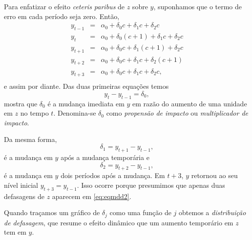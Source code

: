 \documentclass[
]{book}
\theoremstyle{definition}
\theoremstyle{definition}
\theoremstyle{definition}
\theoremstyle{remark}
\begin{document}
Para enfatizar o efeito \emph{ceteris  paribus} de \(z\) sobre \(y\), suponhamos que o termo de erro em cada período seja zero. Então,
\begin{eqnarray*}
y_{t-1}&=&\alpha_0+\delta_0c+\delta_1c+\delta_2c\\
y_{t}&=&\alpha_0+\delta_0(c+1)+\delta_1c+\delta_2c\\
y_{t+1}&=&\alpha_0+\delta_0c+\delta_1(c+1)+\delta_2c\\
y_{t+2}&=&\alpha_0+\delta_0c+\delta_1c+\delta_2(c+1)\\
y_{t+3}&=&\alpha_0+\delta_0c+\delta_1c+\delta_2c,\\
\end{eqnarray*}
e assim por diante. Das duas primeiras equações temos
\begin{equation*}
y_t-y_{t-1} =\delta_0,
\end{equation*}
mostra que \(\delta_0\) é a mudança imediata em \(y\) em razão do aumento de uma unidade em \(z\) no tempo \(t\). Denomina-se \(\delta_0\) como \emph{propensão de impacto} ou \emph{multiplicador de impacto}.

Da mesma forma,
\begin{equation*}
\delta_1  =  y_{t+1} - y_{t-1},
\end{equation*}
é a mudança em \(y\) após a mudança temporária e
\begin{equation*}
\delta_2  =  y_{t+2} - y_{t-1},
\end{equation*}
é a mudança em \(y\) dois períodos após a mudança. Em \(t+3\), \(y\) retornou ao seu nível inicial \(y_{t+3}=y_{t-1}\). Isso ocorre porque presumimos que apenas duas defasagens de \(z\) aparecem em \eqref{eq:eqmdd2}.

Quando traçamos um gráfico de \(\delta_j\) como uma função de \(j\) obtemos a \emph{distribuição de defasagem}, que resume o efeito dinâmico que um aumento temporário em \(z\) tem em \(y\).
\end{document}
